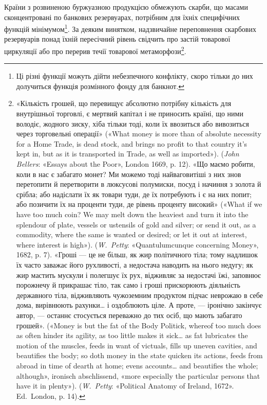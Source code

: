 Країни з розвиненою буржуазною продукцією обмежують
скарби, що масами сконцентровані по банкових резервуарах,
потрібним для їхніх специфічних функцій мінімумом\footnote{
Ці різні функції можуть дійти небезпечного конфлікту, скоро
тільки до них долучиться функція розмінного фонду для банкнот.
}. За деяким винятком, надзвичайне переповнення скарбових резервуарів
понад їхній пересічний рівень свідчить про застій товарової
циркуляції або про перерив течії товарової метаморфози\footnote{
«Кількість грошей, що перевищує абсолютно потрібну кількість
для внутрішньої торговлі, є мертвий капітал і не приносить країні, що
ними володіє, жодного зиску, хіба тільки тоді, коли їх ввозиться
або вивозиться через торговельні операції» («What money is more than
of absolute necessity for a Home Trade, is dead stock, and brings no profit
to that country it’s kept in, but as it is transported in Trade, as well as
imported»). (\emph{John Bellers}: «Essays about the Poor», London 1669, p. 12).
«Що маємо робити, коли в нас є забагато монет? Ми можемо тоді найваговитіші
з них знов перетопити й перетворити в люксусові полумиски,
посуд і начиння з золота й срібла; або надіслати їх як товари туди, де їх
потребують і є на них попит; або позичити їх на проценти туди, де рівень
проценту високий» («What if we have too much coin? We may melt down
the heaviest and turn it into the splendour of plate, vessels or ustensils of
gold and silver; or send it out, as a commodity, where the same is wanted
or desired; or let it out at interest, where interest is high»). (\emph{W.~Petty}:
«Quantulumcunque concerning Money», 1682, p. 7). «Гроші — це не
більш, як жир політичного тіла; тому надлишок їх часто заважає його
рухливості, а недостача наводить на нього недугу; як жир мастить мускули
і полегшує їх рух, відживляє за недостачі їжі, заповнює порожнечу й
прикрашає тіло, так само і гроші прискорюють діяльність державного
тіла, відживляють чужоземним продуктом підчас неврожаю в себе дома,
вирівнюють рахунки\dots{} і оздоблюють ціле. А проте, — іронічно закінчує
автор, — останнє стосується переважно до тих осіб, що мають забагато
грошей». («Money is but the fat of the Body Politick, whereof too much
does as often hinder its agility, as too little makes it sick\dots{} as fat lubricates
the motion of the muscles, feeds in want of victuals, fills up uneven cavities,
and beautifies the body; so doth money in the state quicken its actions,
feeds from abroad in time of dearth at home; evens accounts\dots{} and beautifies
the whole; although», ironisch abschlissend, «more especially the particular
persons that have it in plenty»). (\emph{W.~Petty}: «Political Anatomy
of Ireland, 1672». Ed.~London, p. 14).
}.

